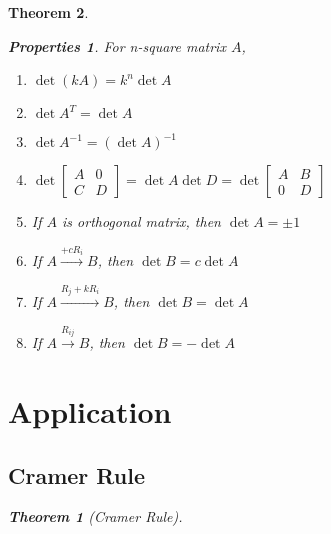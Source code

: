 \documentclass{article}
\newtheorem{theorem}{Theorem}[section]
\theoremstyle{definition}
\newtheorem{pro}{Properties}[section]
\begin{document}
\begin{theorem}
\begin{pro}
    For n-square matrix $A$,
    \begin{enumerate}
        \item $\det (kA)=k^{n}\det A$
        \item $\det A^{T}=\det A$
        \item $\det A^{-1}=(\det A)^{-1}$
        \item $\det \begin{bmatrix}A&0\\C&D\end{bmatrix}=\det A\det D=\det\begin{bmatrix}A&B\\0&D\end{bmatrix}$
        \item If $A$ is orthogonal matrix, then $\det A=\pm1$
        \item If $A\xrightarrow{+cR_{i}} B$, then $\det B=c\det A$
        \item If $A\xrightarrow{R_{j}+kR_{i}} B$, then $\det B=\det A$
        \item If $A\xrightarrow{R_{ij}} B$, then $\det B=-\det A$
    \end{enumerate}
\end{pro}





\section{Application}
\subsection{Cramer Rule}
\begin{theorem}[Cramer Rule]


\end{theorem}
\end{theorem}
\end{document}
